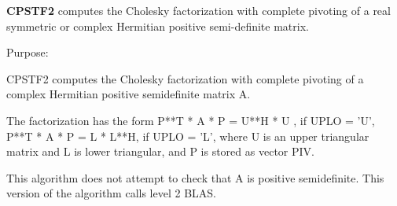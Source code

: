 {\bfseries C\+P\+S\+T\+F2} computes the Cholesky factorization with complete pivoting of a real symmetric or complex Hermitian positive semi-\/definite matrix. 

 \begin{DoxyParagraph}{Purpose\+: }
\begin{DoxyVerb} CPSTF2 computes the Cholesky factorization with complete
 pivoting of a complex Hermitian positive semidefinite matrix A.

 The factorization has the form
    P**T * A * P = U**H * U ,  if UPLO = 'U',
    P**T * A * P = L  * L**H,  if UPLO = 'L',
 where U is an upper triangular matrix and L is lower triangular, and
 P is stored as vector PIV.

 This algorithm does not attempt to check that A is positive
 semidefinite. This version of the algorithm calls level 2 BLAS.\end{DoxyVerb}
 
\end{DoxyParagraph}


